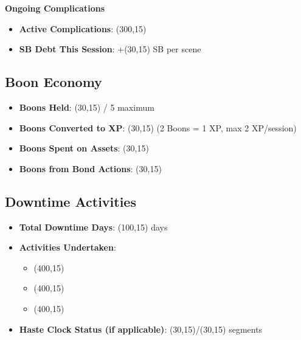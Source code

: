 \documentclass[11pt,letterpaper]{article}
\begin{document}
\vspace{0.3cm}

\noindent\textbf{Ongoing Complications}
\begin{itemize}[leftmargin=*]
    \item \textbf{Active Complications}: \framebox(300,15){}
    \item \textbf{SB Debt This Session}: +\framebox(30,15){} SB per scene
\end{itemize}

\subsection{Boon Economy}

\begin{itemize}[leftmargin=*]
    \item \textbf{Boons Held}: \framebox(30,15){} / 5 maximum
    \item \textbf{Boons Converted to XP}: \framebox(30,15){} (2 Boons = 1 XP, max 2 XP/session)
    \item \textbf{Boons Spent on Assets}: \framebox(30,15){}
    \item \textbf{Boons from Bond Actions}: \framebox(30,15){}
\end{itemize}

\subsection{Downtime Activities}

\begin{itemize}[leftmargin=*]
    \item \textbf{Total Downtime Days}: \framebox(100,15){} days
    \item \textbf{Activities Undertaken}: 
    \begin{itemize}
        \item \framebox(400,15){}
        \item \framebox(400,15){}
        \item \framebox(400,15){}
    \end{itemize}
    \item \textbf{Haste Clock Status (if applicable)}: \framebox(30,15){}/\framebox(30,15){} segments
\end{itemize}
\end{document}
